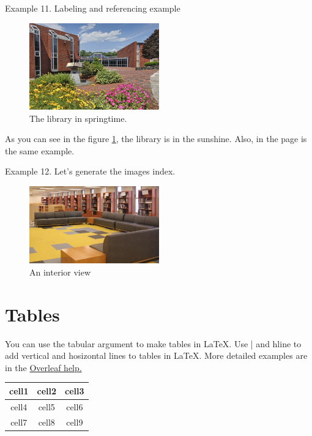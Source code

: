 \documentclass{article}
\begin{document}
\newpage

Example 11. Labeling and referencing example
\begin{figure}[h]
    \centering
    \includegraphics[width=0.5\textwidth]{flowers}
    \caption{The library in springtime.}
    \label{fig:library}
\end{figure}

As you can see in the figure \ref{fig:library}, the library is in the sunshine. Also, in the page \pageref{fig:library} is the same example.

\vspace{1.5cm}

Example 12. Let's generate the images index.
\begin{figure}[h]
    \centering
    \includegraphics[width=0.5\textwidth]{stacks}
    \caption{An interior view}
    \label{fig:inside}
\end{figure}

\newpage

\listoffigures

\section{Tables}
You can use the tabular argument to make tables in \LaTeX.  Use | and hline to add vertical and hosizontal lines to tables in \LaTeX.  More detailed examples are in the \href{https://www.overleaf.com/learn/latex/Tables}{Overleaf help.}

\begin{center}
\begin{tabular}{ c | c  c }
 cell1 & cell2 & cell3 \\ 
 \hline
 cell4 & cell5 & cell6 \\  
 cell7 & cell8 & cell9    
\end{tabular}
\end{center}
\end{document}
